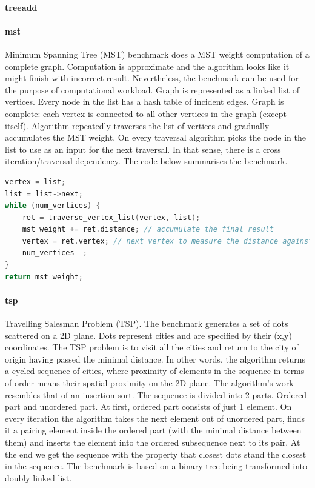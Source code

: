 \documentclass[10pt,a4paper]{report}
\begin{document}
\paragraph{treeadd}

\paragraph{mst} Minimum Spanning Tree (MST) benchmark does a MST weight computation of a complete graph. Computation is approximate and the algorithm looks like it might finish with incorrect result. Nevertheless, the benchmark can be used for the purpose of computational workload. Graph is represented as a linked list of vertices. Every node in the list has a hash table of incident edges. Graph is complete: each vertex is connected to all other vertices in the graph (except itself). Algorithm repeatedly traverses the list of vertices and gradually accumulates the MST weight. On every traversal algorithm picks the node in the list to use as an input for the next traversal. In that sense, there is a cross iteration/traversal dependency. The code below summarises the benchmark.\newline\null
\begin{minipage}[t]{\linewidth}
\begin{lstlisting}[caption={The main algorithm of mst benchmark.},label={lst:mst_code},language=C]
vertex = list;
list = list->next;
while (num_vertices) {
    ret = traverse_vertex_list(vertex, list);
    mst_weight += ret.distance; // accumulate the final result
    vertex = ret.vertex; // next vertex to measure the distance against
    num_vertices--;
}
return mst_weight;
\end{lstlisting}
\end{minipage}


\paragraph{tsp} Travelling Salesman Problem (TSP). The benchmark generates a set of dots scattered on a 2D plane. Dots represent cities and are specified by their (x,y) coordinates. The TSP problem is to visit all the cities and return to the city of origin having passed the minimal distance. In other words, the algorithm returns a cycled sequence of cities, where proximity of elements in the sequence in terms of order means their spatial proximity on the 2D plane.\newline\null
\quad The algorithm’s work resembles that of an insertion sort. The sequence is divided into 2 parts. Ordered part and unordered part. At first, ordered part consists of just 1 element. On every iteration the algorithm takes the next element out of unordered part, finds it a pairing element inside the ordered part (with the minimal distance between them) and inserts the element into the ordered subsequence next to its pair. At the end we get the sequence with the property that closest dots stand the closest in the sequence.\newline\null
\quad The benchmark is based on a binary tree being transformed into doubly linked list. 
\end{document}
